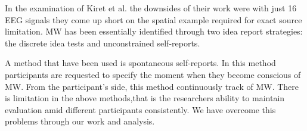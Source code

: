 In the examination of Kiret et al. the downsides of their work were with just 16 EEG signals they come up short on the spatial example required for exact source limitation. MW has been essentially identified through two idea report strategies: the discrete idea tests and unconstrained self-reports.

A method that have been used is spontaneous self-reports. In this method participants are requested to specify the moment when they become conscious of MW. From the participant’s side, this method continuously track of MW. There is limitation in  the above methods,that is the researchers ability to maintain evaluation amid different participants consistently. We have overcome this problems through our work and analysis.
